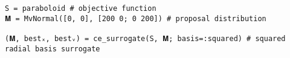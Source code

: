 \begin{lstlisting}[language=JuliaLocal]
S = paraboloid # objective function
𝐌 = MvNormal([0, 0], [200 0; 0 200]) # proposal distribution

(𝐌, bestₓ, bestᵥ) = ce_surrogate(S, 𝐌; basis=:squared) # squared radial basis surrogate
\end{lstlisting}
